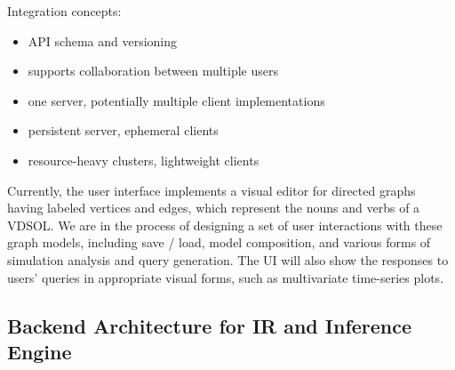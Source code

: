 \documentclass[11pt]{article}
\begin{document}
Integration concepts:
\begin{itemize}
\item API schema and versioning
\item supports collaboration between multiple users
\item one server, potentially multiple client implementations
\item persistent server, ephemeral clients
\item resource-heavy clusters, lightweight clients
\end{itemize}

Currently, the user interface implements a visual editor for directed graphs having labeled vertices and edges, which represent the nouns and verbs of a VDSOL. We are in the process of designing a set of user interactions with these graph models, including save / load, model composition, and various forms of simulation analysis and query generation. The UI will also show the responses to users' queries in appropriate visual forms, such as multivariate time-series plots.

\subsection{Backend Architecture for IR and Inference Engine}
\end{document}
